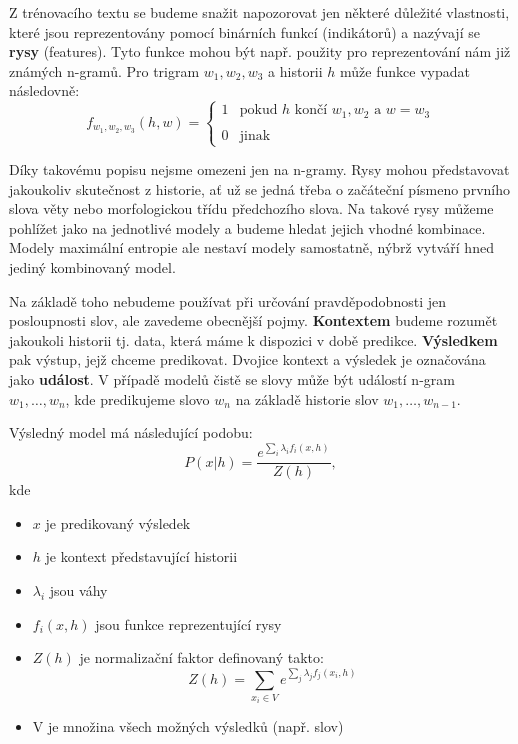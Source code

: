 \documentclass[12pt,a4paper]{report}
\begin{document}
Z trénovacího textu se budeme snažit napozorovat jen některé důležité vlastnosti, které jsou reprezentovány pomocí binárních funkcí (indikátorů) a nazývají se \textbf{rysy} (features). Tyto funkce mohou být např. použity pro reprezentování nám již známých n-gramů. Pro trigram $w_1, w_2, w_3$ a historii $h$ může funkce vypadat následovně:
\begin{equation}
f_{w_1, w_2, w_3}(h,w) = \left\{
\begin{array}{ll}
1 & \text{pokud $h$ končí $w_1, w_2$ a $w = w_3$}\\
\\
0 & \text{jinak}
\end{array}\right.
\end{equation}

Díky takovému popisu nejsme omezeni jen na n-gramy. Rysy mohou představovat jakoukoliv skutečnost z historie, ať už se jedná třeba o začáteční písmeno prvního slova věty nebo morfologickou třídu předchozího slova. Na takové rysy můžeme pohlížet jako na jednotlivé modely a budeme hledat jejich vhodné kombinace. Modely maximální entropie ale nestaví modely samostatně, nýbrž vytváří hned jediný kombinovaný model.

Na základě toho nebudeme používat při určování pravděpodobnosti jen posloupnosti slov, ale zavedeme obecnější pojmy. \textbf{Kontextem} budeme rozumět jakoukoli historii tj. data, která máme k dispozici v době predikce. \textbf{Výsledkem} pak výstup, jejž chceme predikovat. Dvojice kontext a výsledek je označována jako \textbf{událost}. V případě modelů čistě se slovy může být událostí n-gram $w_1, \ldots, w_n$, kde predikujeme slovo $w_n$ na základě historie slov $w_1, \ldots, w_{n-1}$.

Výsledný model má následující podobu:
\begin{equation}
P(x|h) = \frac{e^{\sum_i \lambda_i f_i(x,h)}}{Z(h)},
\end{equation}
kde \begin{itemize} 
\item{$x$ je predikovaný výsledek}
\item{$h$ je kontext představující historii}
\item{$\lambda_i$ jsou váhy}
\item{$f_i(x,h)$ jsou funkce reprezentující rysy}
\item{$Z(h)$ je normalizační faktor definovaný takto:
\begin{equation}
Z(h) = \sum_{x_i \in V} e^{\sum_j \lambda_j f_j(x_i,h)}
\end{equation} }
\item{V je množina všech možných výsledků (např. slov)}
\end{itemize}
\end{document}
